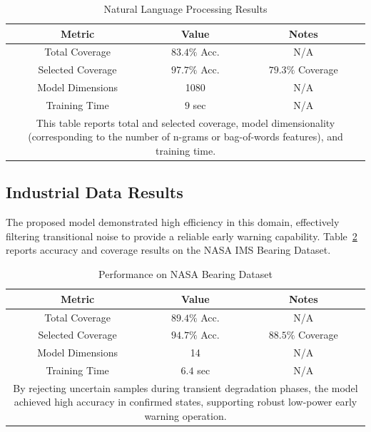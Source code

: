 \documentclass[conference]{IEEEtran}
\begin{document}
\begin{table}[H]
    \centering
    \caption{Natural Language Processing Results}
    \label{tab:NLP-SemEval}
    \begin{tabular}{c c c}
        \hline
        Metric & Value & Notes\\
        \hline
        Total Coverage & $83.4\%$ Acc. & N/A\\
        Selected Coverage & $97.7\%$ Acc. & $79.3\%$ Coverage\\
        Model Dimensions & 1080 & N/A\\
        Training Time & $9$ sec & N/A\\
        \hline
        \multicolumn{3}{p{0.9\linewidth}}{\centering
        This table reports total and selected coverage, model dimensionality (corresponding to the number of n-grams or bag-of-words features), and training time.
        }
    \end{tabular}
\end{table}

\subsection{Industrial Data Results}

The proposed model demonstrated high efficiency in this domain, effectively filtering transitional noise to provide a reliable early warning capability. Table~\ref{tab:NASA-Results} reports accuracy and coverage results on the NASA IMS Bearing Dataset.

\begin{table}[H]
    \centering
    \caption{Performance on NASA Bearing Dataset}
    \label{tab:NASA-Results}
    \begin{tabular}{c c c}
        \hline
        Metric & Value & Notes\\
        \hline
        Total Coverage & $89.4\%$ Acc. & N/A\\
        Selected Coverage & $94.7\%$ Acc. & $88.5\%$ Coverage\\
        Model Dimensions & 14 & N/A\\
        Training Time & $6.4$ sec & N/A\\
        \hline
        \multicolumn{3}{p{0.9\linewidth}}{\centering
        By rejecting uncertain samples during transient degradation phases, the model achieved high accuracy in confirmed states, supporting robust low-power early warning operation.
        }
    \end{tabular}
\end{table}
\end{document}
